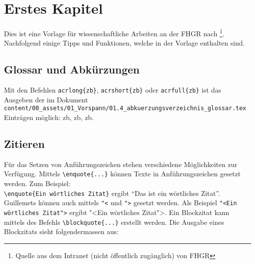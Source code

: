 \chapter{Erstes Kapitel}
\label{kap:eins}
Dies ist eine Vorlage für wissenschaftliche Arbeiten an der FHGR nach \textcite{stepanenko_leitfaden_2023}\footnote{Quelle aus dem Intranet (nicht öffentlich zugänglich) von FHGR}. Nachfolgend einige Tipps und Funktionen, welche in der Vorlage enthalten sind.

\section{Glossar und Abkürzungen}
Mit den Befehlen \lstinline|acrlong{zb}|, \lstinline|acrshort{zb}| oder \lstinline|acrfull{zb}| ist das Ausgeben der im Dokument \lstinline{content/00_assets/01_Vorspann/01.4_abkuerzungsverzeichnis_glossar.tex} Einträgen möglich: \acrshort{zb}, \acrshort{zb}, \acrfull{zb}.

\section{Zitieren}
Für das Setzen von Anführungszeichen stehen verschiedene Möglichkeiten zur Verfügung. Mittels \lstinline|\enquote{...}| können Texte in Anführungszeichen gesetzt werden. Zum Beispiel: \\\lstinline|\enquote{Ein wörtliches Zitat}| ergibt \enquote{Das ist ein wörtliches Zitat}. Guillemets können auch mittels \lstinline{"<} und \lstinline{">} gesetzt werden. Als Beispiel \lstinline{"<Ein wörtliches Zitat">} ergibt "<Ein wörtliches Zitat">. Ein Blockzitat kann mittels des Befehls \lstinline|\blockquote{...}| erstellt werden. Die Ausgabe eines Blockzitats sieht folgendermassen aus:

